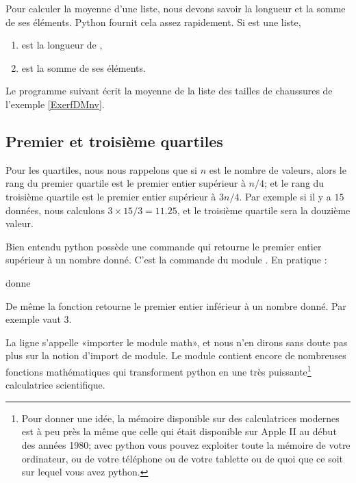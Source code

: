     Pour calculer la moyenne d'une liste, nous devons savoir la longueur et la somme de ses éléments. Python fournit cela assez rapidement. Si  est une liste,
    \begin{enumerate}
        \item
             est la longueur de ,
        \item
             est la somme de ses éléments.
    \end{enumerate}
    
    
Le programme suivant écrit la moyenne de la liste des tailles de chaussures de l'exemple \ref{ExerfDMnv}.



%

\subsection{Premier et troisième quartiles}

Pour les quartiles, nous nous rappelons que si \( n\) est le nombre de valeurs, alors le rang du premier quartile est le premier entier supérieur à \( n/4\); et le rang du troisième quartile est le premier entier supérieur à \( 3n/4\). Par exemple si il y a \( 15\) données, nous calculons \( 3\times 15/3= 11.25\), et le troisième quartile sera la douzième valeur.


Bien entendu python possède une commande qui retourne le premier entier supérieur à un nombre donné. C'est la commande  du module . En pratique :



donne 


De même la fonction  retourne le premier entier inférieur à un nombre donné. Par exemple  vaut \( 3\).

La ligne  s'appelle «importer le module math», et nous n'en dirons sans doute pas plus sur la notion d'import de module. Le module  contient encore de nombreuses fonctions mathématiques qui transforment python en une très puissante\footnote{Pour donner une idée, la mémoire disponible sur des calculatrices modernes est à peu près la même que celle qui était disponible sur Apple II au début des années 1980; avec python vous pouvez exploiter toute la mémoire de votre ordinateur, ou de votre téléphone ou de votre tablette ou de quoi que ce soit sur lequel vous avez python.} calculatrice scientifique.


